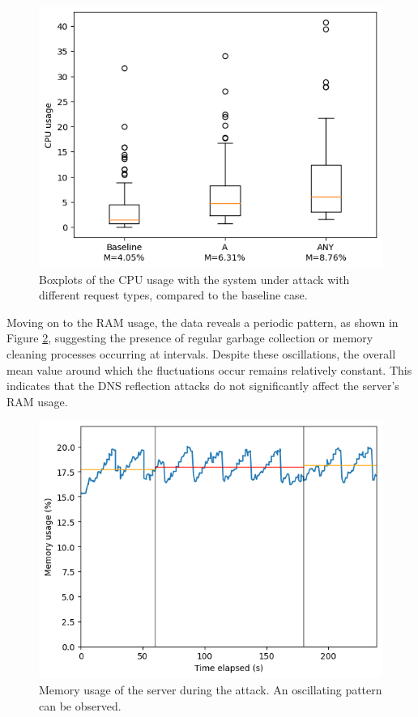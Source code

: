 \begin{figure}[H]
    \centering
    \includegraphics[width=\columnwidth]{Sections/Images/Boxplots_Server.png}
    \caption{Boxplots of the CPU usage with the system under attack with different request types, compared to the baseline case.}
    \label{fig:Boxplots_server}
\end{figure}
\noindent Moving on to the RAM usage, the data reveals a periodic pattern, as shown in Figure \ref{fig:Memory_server}, suggesting the presence of regular garbage collection or memory cleaning processes occurring at intervals. Despite these oscillations, the overall mean value around which the fluctuations occur remains relatively constant. This indicates that the DNS reflection attacks do not significantly affect the server's RAM usage.\\
\begin{figure}[H]
    \centering
    \includegraphics[width=\columnwidth]{Sections/Images/Memory_Server.png}
    \caption{Memory usage of the server during the attack. An oscillating pattern can be observed.}
    \label{fig:Memory_server}
\end{figure}
